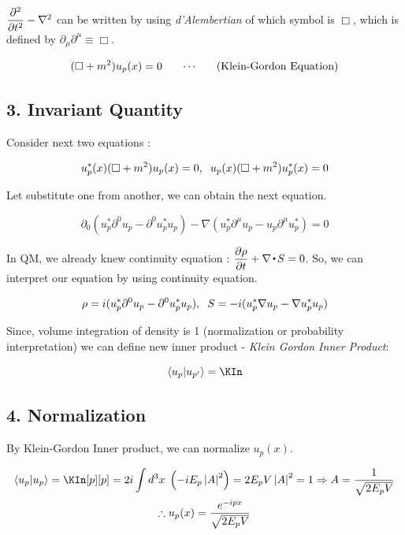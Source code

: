 \documentclass[11pt,letterpaper]{article}
\begin{document}
$\dfrac{\partial^2}{\partial t^2}-\nabla^2$ can be written by using \textit{d'Alembertian} of which symbol is $\Box$, which is defined by $\partial_{\mu}\partial^{\mu} \equiv \Box$.

\begin{equation}
\KG u_{p}(x) = 0 \HS\HS \cdots \HS\HS \text{(Klein-Gordon Equation)}
\end{equation}

\vs

\subsection*{3. Invariant Quantity}

Consider next two equations :

\begin{equation}
\u^*(x)\KG\u(x) = 0\Com \hs \u(x)\KG\u^*(x) = 0
\end{equation}

Let substitute one from another, we can obtain the next equation.

\begin{equation}
 \partial_0(u_p^*\partial^0u_p-\partial^0u_p^*u_p) - \nabla(u_p^*\partial^\mu u_p - u_p\partial^\mu u_p^*)=0
\end{equation}

In QM, we already knew continuity equation : $\PD{\rho}{t} + \nabla\ld S = 0$. So, we can interpret our equation by using continuity equation.

\begin{equation}
 \rho = \Kin\Com \hs S= -i(\u^*\nabla\u - \nabla \u^* \u)
\end{equation}

Since, volume integration of density is 1 (normalization or probability interpretation) we can define new inner product
 - \textit{Klein Gordon Inner Product}:

\begin{equation}
 \braket{\u|\u[p']} = \KIn
\end{equation} 

\subsection*{4. Normalization}

By Klein-Gordon Inner product, we can normalize $u_p(x)$.

\begin{gather}
\braket{\u|\u} = \KIn[p][p] = 2i \int d^3x \hs \BKS{-iE_p \abs{A}^2} = 2E_p V\abs{A}^2 = 1 \Rightarrow A = \dfrac{1}{\sqrt{2E_pV}} \\
\therefore \u(x) = \frac{e^{-ipx}}{\sqrt{2E_pV}}
\end{gather}
\end{document}
